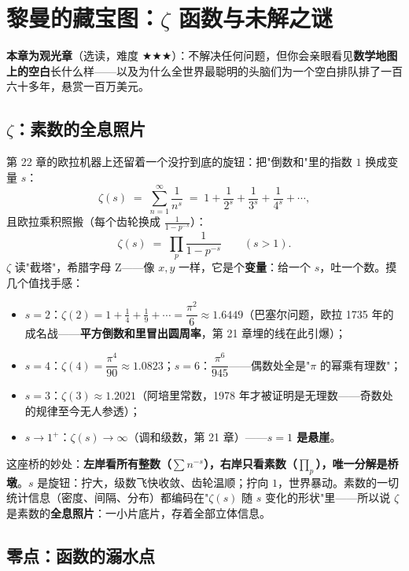 \chapter{黎曼的藏宝图：\texorpdfstring{$\zeta$}{ζ} 函数与未解之谜}

\noindent\textbf{本章为观光章}（选读，难度 $\bigstar\bigstar\bigstar$）：不解决任何问题，但你会亲眼看见\textbf{数学地图上的空白}长什么样——以及为什么全世界最聪明的头脑们为一个空白排队排了一百六十多年，悬赏一百万美元。

\section{$\zeta$：素数的全息照片}

第 22 章的欧拉机器上还留着一个没拧到底的旋钮：把"倒数和"里的指数 $1$ 换成变量 $s$：
\[
\zeta(s) \;=\; \sum_{n=1}^{\infty}\frac{1}{n^s} \;=\; 1 + \frac1{2^s} + \frac1{3^s} + \frac1{4^s} + \cdots ,
\]
且欧拉乘积照搬（每个齿轮换成 $\tfrac{1}{1-p^{-s}}$）：
\[
\zeta(s) \;=\; \prod_{p}\frac{1}{1-p^{-s}} \qquad (s > 1).
\]
$\zeta$ 读"截塔"，希腊字母 Z——像 $x, y$ 一样，它是个\textbf{变量}：给一个 $s$，吐一个数。摸几个值找手感：
\begin{itemize}
\item $s = 2$：$\zeta(2) = 1 + \tfrac14 + \tfrac19+\cdots = \dfrac{\pi^2}{6} \approx 1.6449$（巴塞尔问题，欧拉 1735 年的成名战——\textbf{平方倒数和里冒出圆周率}，第 21 章埋的线在此引爆）；
\item $s = 4$：$\zeta(4) = \dfrac{\pi^4}{90} \approx 1.0823$；$s=6$：$\dfrac{\pi^6}{945}$——偶数处全是"$\pi$ 的幂乘有理数"；
\item $s = 3$：$\zeta(3) \approx 1.2021$（阿培里常数，1978 年才被证明是无理数——奇数处的规律至今无人参透）；
\item $s \to 1^+$：$\zeta(s) \to \infty$（调和级数，第 21 章）——\textbf{$s=1$ 是悬崖}。
\end{itemize}
这座桥的妙处：\textbf{左岸看所有整数（$\sum n^{-s}$），右岸只看素数（$\prod_p$），唯一分解是桥墩}。$s$ 是旋钮：拧大，级数飞快收敛、齿轮温顺；拧向 $1$，世界暴动。素数的一切统计信息（密度、间隔、分布）都编码在"$\zeta(s)$ 随 $s$ 变化的形状"里——所以说 $\zeta$ 是素数的\textbf{全息照片}：一小片底片，存着全部立体信息。

\section{零点：函数的溺水点}

